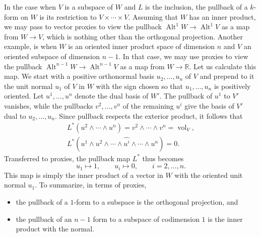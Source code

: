 {In the case when $V$ is a subspace of $W$ and $L$ is the inclusion, the pullback of a $k$-form on $W$ is its restriction to $V\times\cdots\times V$. Assuming that $W$ has an inner product, we may pass to vector proxies to view the pullback $\operatorname{Alt}^1W\to\operatorname{Alt}^1V$ as a map from $W\to V$, which is nothing other than the orthogonal projection. Another example, is when $W$ is an oriented inner product space of dimension $n$ and $V$ an oriented subspace of dimension $n-1$. In that case, we may use proxies to view the pullback $\operatorname{Alt}^{n-1}W\to\operatorname{Alt}^{n-1}V$ as a map from $W\to\mathbb R$. Let us calculate this map. We start with a positive orthonormal basis $u_2,\ldots,u_n$ of $V$ and prepend to it the unit normal $u_1$ of $V$ in $W$ with the sign chosen so that $u_1,\ldots,u_n$ is positively oriented. Let $u^1,\ldots,u^n$ denote the dual basis of $W'$. The pullback of $u^1$ to $V'$ vanishes, while the pullbacks $v^2,\ldots,v^n$ of the remaining $u^i$ give the basis of $V'$ dual to $u_2,\ldots,u_n$. Since pullback respects the exterior product, it follows that}
\[
\begin{gathered}
L^*(u^2\wedge\cdots\wedge u^n)=v^2\wedge\cdots\wedge v^n=\operatorname{vol}_V,\\
L^*(u^1\wedge u^2\wedge\cdots\wedge\widehat{u^i}\wedge\cdots\wedge u^n)=0.
\end{gathered}
\]
{Transferred to proxies, the pullback map $L^*$ thus becomes}
\[
u_1\mapsto1,\qquad u_i\mapsto0,\qquad i=2,\ldots,n.
\]
{This map is simply the inner product of a vector in $W$ with the oriented unit normal $u_1$. To summarize, in terms of proxies,}
\begin{itemize}
\item{the pullback of a $1$-form to a subspace is the orthogonal projection, and}
\item{the pullback of an $n-1$ form to a subspace of codimension $1$ is the inner product with the normal.}
\end{itemize}

